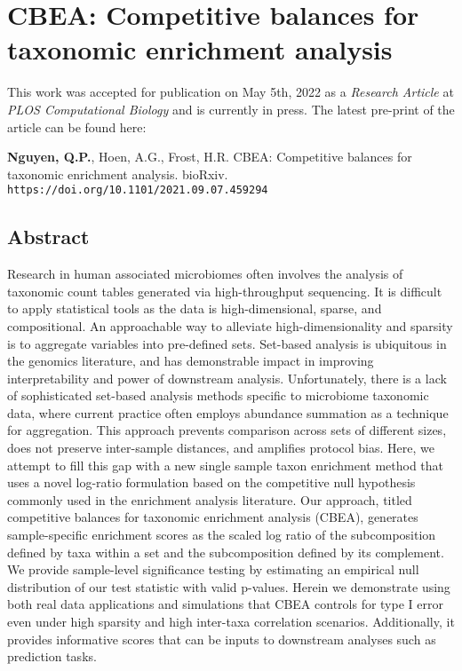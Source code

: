 \chapter{CBEA: Competitive balances for taxonomic enrichment analysis}
This work was accepted for publication on May 5th, 2022 as a \emph{Research Article} at \emph{PLOS Computational Biology} and is currently in press. The latest pre-print of the article can be found here: 

\begin{center}
\justifying
\textbf{Nguyen, Q.P.}, Hoen, A.G., Frost, H.R. CBEA: Competitive balances for taxonomic enrichment analysis. bioRxiv. \texttt{https://doi.org/10.1101/2021.09.07.459294}
\end{center}

\section{Abstract}
Research in human associated microbiomes often involves the analysis of taxonomic count tables generated via high-throughput sequencing. It is difficult to apply statistical tools as the data is high-dimensional, sparse, and compositional. An approachable way to alleviate high-dimensionality and sparsity is to aggregate variables into pre-defined sets. Set-based analysis is ubiquitous in the genomics literature, and has demonstrable impact in improving interpretability and power of downstream analysis. Unfortunately, there is a lack of sophisticated set-based analysis methods specific to microbiome taxonomic data, where current practice often employs abundance summation as a technique for aggregation. This approach prevents comparison across sets of different sizes, does not preserve inter-sample distances, and amplifies protocol bias. Here, we attempt to fill this gap with a new single sample taxon enrichment method that uses a novel log-ratio formulation based on the competitive null hypothesis commonly used in the enrichment analysis literature. Our approach, titled competitive balances for taxonomic enrichment analysis (CBEA), generates sample-specific enrichment scores as the scaled log ratio of the subcomposition defined by taxa within a set and the subcomposition defined by its complement. We provide sample-level significance testing by estimating an empirical null distribution of our test statistic with valid p-values. Herein we demonstrate using both real data applications and simulations that CBEA controls for type I error even under high sparsity and high inter-taxa correlation scenarios. Additionally, it provides informative scores that can be inputs to downstream analyses such as prediction tasks. 

